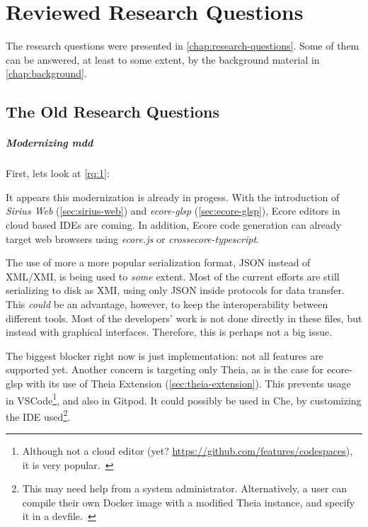 \chapter{Reviewed Research Questions}\label{chap:review-research-questions}

The research questions were presented in \cref{chap:research-questions}.
Some of them can be answered, at least to some extent, by the background material in \cref{chap:background}.

\section{The Old Research Questions}

\paragraph*{Modernizing \acrshort{mdd}}
First, lets look at \cref{rq:1}:
\begin{displayquote}
  
\end{displayquote}

It appears this modernization is already in progess.
With the introduction of \emph{Sirius Web} (\cref{sec:sirius-web}) and \emph{ecore-glsp} (\cref{sec:ecore-glsp}), \gls{Ecore} editors in \gls{cloud} based \glspl{IDE} are coming.
In addition, \gls{Ecore} code generation can already target web browsers using \emph{ecore.js} or \emph{crossecore-typescript}. %


The use of more a more popular serialization format, \gls{JSON} instead of XML/\gls{XMI}, is being used to \textit{some} extent.
Most of the current efforts are still serializing to disk as \gls{XMI}, using only \gls{JSON} inside protocols for data transfer.
This \emph{could} be an advantage, however, to keep the interoperability between different tools.
Most of the developers' work is not done directly in these files, but instead with graphical interfaces. Therefore, this is perhaps not a big issue.


The biggest blocker right now is just implementation: not all features are supported yet.
Another concern is targeting only \gls{Theia}, as is the case for ecore-glsp with its use of Theia Extension (\cref{sec:theia-extension}).
This prevents usage in \gls{VSCode}\footnote{Although not a \gls{cloud} editor (yet? \href{https://github.com/features/codespaces}{https://github.com/features/codespaces}), it is very popular.~\cite{stackoverflowStackOverflowDeveloper2019}}, and also in Gitpod.
It could possibly be used in Che, by customizing the \gls{IDE} used\footnote{This may need help from a system administrator. Alternatively, a user can compile their own Docker image with a modified Theia instance, and specify it in a devfile.~\cite{maxshaposhnikIntroductionDevfile2020}}.



